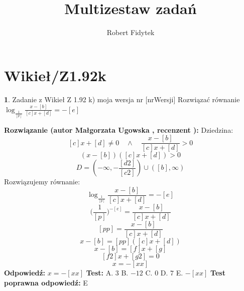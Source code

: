 \documentclass[12pt, a4paper]{article}
\title{Multizestaw zadań}
\author{Robert Fidytek}
\date{}
\theoremstyle{definition} %
\newtheorem{zad}{}
\newcommand{\kategoria}[1]{\section{#1}} %
\newcommand{\zadStart}[1]{\begin{zad}#1\newline} %
\newcommand{\zadStop}{\end{zad}}   %
\newcommand{\rozwStart}[2]{\noindent \textbf{Rozwiązanie (autor #1 , recenzent #2): }\newline} %
\newcommand{\rozwStop}{\newline}                                            %
\newcommand{\odpStart}{\noindent \textbf{Odpowiedź:}\newline}    %
\newcommand{\odpStop}{\newline}                                             %
\newcommand{\testStart}{\noindent \textbf{Test:}\newline} %
\newcommand{\testStop}{\newline} %
\newcommand{\kluczStart}{\noindent \textbf{Test poprawna odpowiedź:}\newline} %
\newcommand{\kluczStop}{\newline} %
\begin{document}
\maketitle


\kategoria{Wikieł/Z1.92k}
\zadStart{Zadanie z Wikieł Z 1.92 k) moja wersja nr [nrWersji]}
Rozwiązać równanie $\log_{\frac{1}{[p]}}{\frac{x-[b]}{[c]x+[d]}}=-[e]$
\zadStop
\rozwStart{Małgorzata Ugowska}{}
Dziedzina:
$$[c]x+[d] \ne 0 \quad \wedge \quad \frac{x-[b]}{[c]x+[d]}>0$$
$$(x-[b])([c]x+[d])>0$$
$$D=(-\infty, -\frac{[d2]}{[c2]}) \cup ([b], \infty)$$
Rozwiązujemy równanie:
$$\log_{\frac{1}{[p]}}{\frac{x-[b]}{[c]x+[d]}}=-[e]$$
$$\Big({\frac{1}{[p]}}\Big)^{-[e]}= \frac{x-[b]}{[c]x+[d]}$$
$$[pp] = \frac{x-[b]}{[c]x+[d]}$$
$$x -[b]= [pp]([c]x+[d])$$
$$x -[b]= [f]x+[g]$$
$$[f2]x+[g2]=0$$
$$x=-[xx]$$
\rozwStop
\odpStart
$x =-[xx]$
\odpStop
\testStart
A. $3$
B. $-12$
C. $0$
D. $7$
E. $-[xx]$
\testStop
\kluczStart
E
\kluczStop
\end{document}
